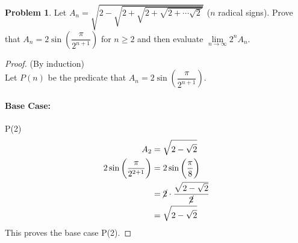 \documentclass[14]{article}
\theoremstyle{definition}
\newtheorem{prob}{Problem}
\begin{document}
\begin{prob}
Let $A_n = \sqrt{2 - \sqrt{2 + \sqrt{2 + \sqrt{2 + \cdots \sqrt{2}}}}}$ ($n$ radical signs). Prove that $A_n = 2 \sin\left(\dfrac{\pi}{2^{n+1}}\right)$ for $n \geq 2$ and then evaluate $\lim\limits_{n \to \infty} 2^n A_n$.
\begin{proof}
(By induction)\\
Let $P(n)$ be the predicate that $A_n = 2 \sin\left(\dfrac{\pi}{2^{n+1}}\right)$.
\paragraph{Base Case:} P(2)
\begin{align*}
A_2 &= \sqrt{2 - \sqrt{2}}\\
2\sin\left(\dfrac{\pi}{2^{2+1}}\right) &= 2\sin\left(\dfrac{\pi}{8}\right)\\
&= \cancel{2} \cdot \dfrac{\sqrt{2 - \sqrt{2}}}{\cancel{2}}\\
&= \sqrt{2 - \sqrt{2}}
\end{align*}
This proves the base case P(2).

\end{proof}
\end{prob}
\end{document}

